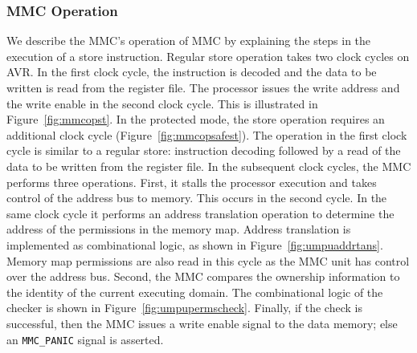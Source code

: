 \subsubsection{MMC Operation}
%
We describe the MMC's operation of MMC by explaining the steps in
the execution of a store instruction.
%
Regular store operation takes two clock cycles on AVR.
%
In the first clock cycle, the instruction is decoded and the data to
be written is read from the register file.
%
The processor issues the write address and the write enable in the
second clock cycle.
%
This is illustrated in Figure~\ref{fig:mmcopst}.
%
In the protected mode, the store operation requires an additional
clock cycle (Figure~\ref{fig:mmcopsafest}).
%
The operation in the first clock cycle is similar to a regular store:
instruction decoding followed by a read of the data to be written from
the register file.
%
In the subsequent clock cycles, the MMC performs three operations.
%
First, it stalls the processor execution and takes control of the
address bus to memory.
%
This occurs in the second cycle.
%
In the same clock cycle it performs an address translation operation
to determine the address of the permissions in the memory map.
%
Address translation is implemented as combinational logic, as shown in
Figure~\ref{fig:umpuaddrtans}.
%
Memory map permissions are also read in this cycle as the MMC unit has
control over the address bus.
%
Second, the MMC compares the ownership information to the identity of
the current executing domain.
%
The combinational logic of the checker is shown in
Figure~\ref{fig:umpupermscheck}.
%
Finally, if the check is successful, then the MMC issues a write
enable signal to the data memory; else an \texttt{MMC\_PANIC} signal is
asserted.
%
%
